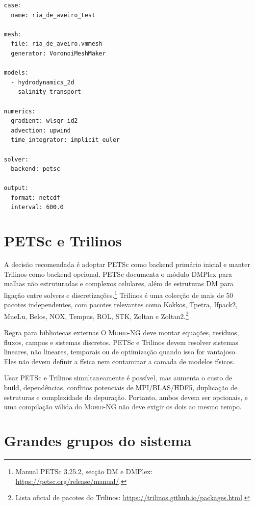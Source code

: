 \documentclass[11pt,a4paper]{article}
\newcommand{\mohidng}{\textsc{Mohid-NG}}
\begin{document}
\begin{lstlisting}[style=caseyaml,caption={Exemplo mínimo de interface declarativa para utilizador operacional.}]
case:
  name: ria_de_aveiro_test

mesh:
  file: ria_de_aveiro.vmmesh
  generator: VoronoiMeshMaker

models:
  - hydrodynamics_2d
  - salinity_transport

numerics:
  gradient: wlsqr-id2
  advection: upwind
  time_integrator: implicit_euler

solver:
  backend: petsc

output:
  format: netcdf
  interval: 600.0
\end{lstlisting}

\section{PETSc e Trilinos}

A decisão recomendada é adoptar PETSc como backend primário inicial e manter Trilinos como backend opcional. PETSc documenta o módulo DMPlex para malhas não estruturadas e complexos celulares, além de estruturas DM para ligação entre solvers e discretizações.\footnote{Manual PETSc 3.25.2, secção DM e DMPlex: \url{https://petsc.org/release/manual/}.} Trilinos é uma colecção de mais de 50 pacotes independentes, com pacotes relevantes como Kokkos, Tpetra, Ifpack2, MueLu, Belos, NOX, Tempus, ROL, STK, Zoltan e Zoltan2.\footnote{Lista oficial de pacotes do Trilinos: \url{https://trilinos.github.io/packages.html}.}

\begin{decisionbox}{Regra para bibliotecas externas}
O \mohidng{} deve montar equações, resíduos, fluxos, campos e sistemas discretos. PETSc e Trilinos devem resolver sistemas lineares, não lineares, temporais ou de optimização quando isso for vantajoso. Eles não devem definir a física nem contaminar a camada de modelos físicos.
\end{decisionbox}

Usar PETSc e Trilinos simultaneamente é possível, mas aumenta o custo de build, dependências, conflitos potenciais de MPI/BLAS/HDF5, duplicação de estruturas e complexidade de depuração. Portanto, ambos devem ser opcionais, e uma compilação válida do \mohidng{} não deve exigir os dois ao mesmo tempo.

\section{Grandes grupos do sistema}
\end{document}
